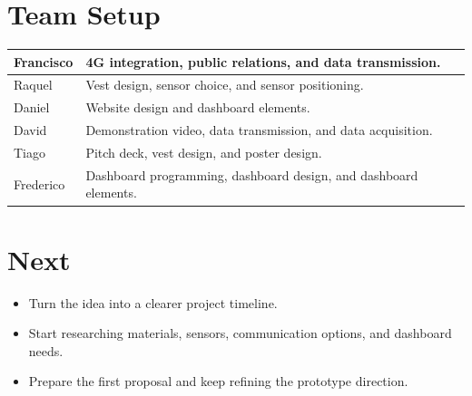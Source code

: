 \documentclass[11pt,a4paper]{article}
\begin{document}
\section{Team Setup}
\begin{tabularx}{\textwidth}{|B{0.24\textwidth}|Y|}
\hline
Francisco & 4G integration, public relations, and data transmission. \\
\hline
Raquel & Vest design, sensor choice, and sensor positioning. \\
\hline
Daniel & Website design and dashboard elements. \\
\hline
David & Demonstration video, data transmission, and data acquisition. \\
\hline
Tiago & Pitch deck, vest design, and poster design. \\
\hline
Frederico & Dashboard programming, dashboard design, and dashboard elements. \\
\hline
\end{tabularx}

\section{Next}
\begin{itemize}
  \item Turn the idea into a clearer project timeline.
  \item Start researching materials, sensors, communication options, and dashboard needs.
  \item Prepare the first proposal and keep refining the prototype direction.
\end{itemize}
\end{document}
